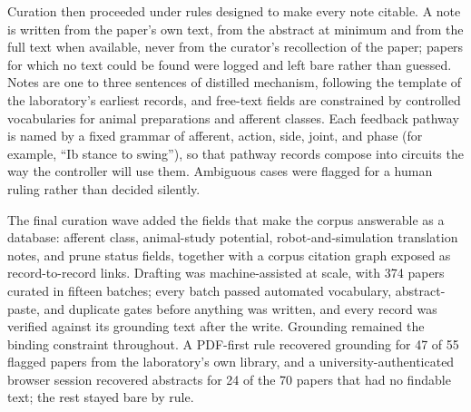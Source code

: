 Curation then proceeded under rules designed to make every note citable. A note is written from the paper's own text, from the abstract at minimum and from the full text when available, never from the curator's recollection of the paper; papers for which no text could be found were logged and left bare rather than guessed. Notes are one to three sentences of distilled mechanism, following the template of the laboratory's earliest records, and free-text fields are constrained by controlled vocabularies for animal preparations and afferent classes. Each feedback pathway is named by a fixed grammar of afferent, action, side, joint, and phase (for example, ``Ib stance to swing''), so that pathway records compose into circuits the way the controller will use them. Ambiguous cases were flagged for a human ruling rather than decided silently.

The final curation wave added the fields that make the corpus answerable as a database: afferent class, animal-study potential, robot-and-simulation translation notes, and prune status fields, together with a corpus citation graph exposed as record-to-record links. Drafting was machine-assisted at scale, with 374 papers curated in fifteen batches; every batch passed automated vocabulary, abstract-paste, and duplicate gates before anything was written, and every record was verified against its grounding text after the write. Grounding remained the binding constraint throughout. A PDF-first rule recovered grounding for 47 of 55 flagged papers from the laboratory's own library, and a university-authenticated browser session recovered abstracts for 24 of the 70 papers that had no findable text; the rest stayed bare by rule.


